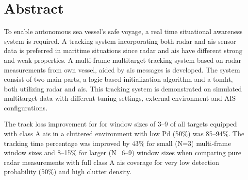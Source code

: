 
\section*{\huge Abstract}
\hfill
\noindent

To enable autonomous sea vessel's safe voyage, a real time situational awareness system is required. A tracking system incorporating both radar and \gls{ais} sensor data is preferred in maritime situations since radar and \gls{ais} have different strong and weak properties. A multi-frame multitarget tracking system based on radar \glspl{measurement} from own vessel, aided by \gls{ais} messages is developed. The system consist of two main parts, a logic based initialization algorithm and a \gls{tomht}, both utilizing radar and \gls{ais}. This tracking system is demonstrated on simulated multitarget data with different tuning settings, external environment and AIS configurations.

The track loss improvement for for window sizes of 3--9 of all targets equipped with class A \gls{ais} in a cluttered environment with low \gls{Pd} (50\%) was 85--94\%. The tracking time percentage was improved by 43\% for small (N=3) multi-frame window sizes and 8--15\% for larger (N=6--9) window sizes when comparing pure radar measurements with full class A \gls{ais} coverage for very low detection probability (50\%) and high clutter density.